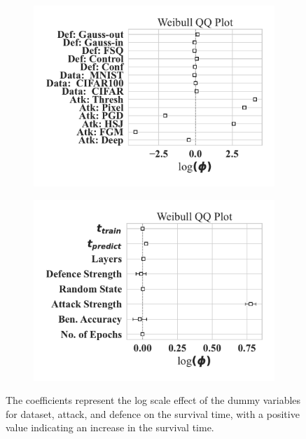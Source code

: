 \begin{figure}
    \centering
	\begin{subfigure}
	\centering
    \includegraphics[width=.38\textwidth]{plots/weibull_aft_dummies.pdf}
    \label{fig:covariates}
    \end{subfigure}
    \begin{subfigure}
	\centering
    \includegraphics[width=.38\textwidth]{plots/weibull_aft.pdf}
    \label{fig:dummies}
    \end{subfigure}
    \caption{The coefficients represent the log scale effect of the dummy variables for dataset, attack, and defence on the survival time, with a positive value indicating an increase in the survival time.}
\end{figure}
